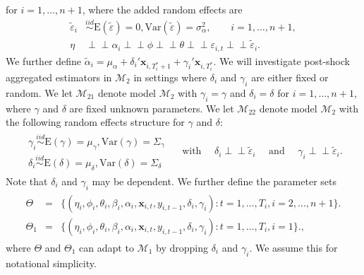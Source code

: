\documentclass[11pt]{article}
\def\mbf#1{\mathbf{#1}} %
\newcommand{\simiid}{\stackrel{iid}{\sim}} %
\newcommand{\indep}{\perp \!\!\! \perp } %
\def\mrm#1{\mathrm{#1}} %
\def\t#1{\tilde{#1}} %
\def\mc#1{\mathcal{#1}} %
\def\E#1{\mathrm{E}(#1)} %
\def\var#1{\mathrm{Var}(#1)} %
\theoremstyle{definition}
\begin{document}
for $i = 1, \ldots, n+1$, where the added random effects are
\begin{align*}
\t{\varepsilon}_{i} &\simiid  \E{\t{\varepsilon}}=0, \var{\t{\varepsilon}}=\sigma^2_{\alpha}, \qquad i = 1, \ldots, n+1,\\
\eta &\indep  \alpha_i \indep \phi \indep \theta \indep \varepsilon_{i,t} \indep \t{\varepsilon}_{i}.
\end{align*}
We further define 
$\tilde{\alpha}_i=\mu_{\alpha}+\delta_i'\mbf{x}_{i, T_i^*+1}+\gamma_i'\mbf{x}_{i, T_i^*}$. 
We will investigate post-shock aggregated estimators in $\mc{M}_2$ 
in settings where $\delta_i$ and $\gamma_i$ are either fixed or random. 
We let $\mc{M}_{21}$ denote model $\mc{M}_{2}$ with $\gamma_i = \gamma$ 
and $\delta_i = \delta$ for $i= 1, \ldots, n+1$, 
where $\gamma$ and $\delta$ are fixed unknown parameters.
We let $\mc{M}_{22}$ denote model $\mc{M}_{2}$ with the following random effects 
structure for $\gamma$ and $\delta$:
\begin{align*}
\begin{array}{c}
  \gamma_i \overset{iid}{\sim} \mrm{E}(\gamma) = \mu_\gamma, \var{\gamma} = \Sigma_\gamma \\
  \delta_i \overset{iid}{\sim} \mrm{E}(\delta) = \mu_\delta, \var{\delta} = \Sigma_\delta
\end{array}
   \quad \text{ with } \quad  \delta_i  \indep \t{\varepsilon}_{i} \quad  \text{ and } \quad \gamma_i  \indep \t{\varepsilon}_{i}.
\end{align*}
Note that $\delta_i$ and $\gamma_i$ may be dependent. We further define the parameter sets
\begin{align}
  \begin{array}{lll}
     \Theta &= &\{(\eta_i, \phi_i, \theta_i, \beta_i, \alpha_i, \mbf{x}_{i,t}, y_{i,t-1}, \delta_i, \gamma_i)\colon t= 1, \ldots, T_i, i = 2, \ldots, n +1\}.\\
    \Theta_1 &= &\{(\eta_i, \phi_i, \theta_i, \beta_i, \alpha_i, \mbf{x}_{i,t}, y_{i,t-1}, \delta_i, \gamma_i)\colon t= 1, \ldots, T_i, i = 1\}.\label{parameter},
  \end{array}
\end{align}
where $\Theta$ and $\Theta_1$ can adapt to $\mc{M}_1$ by dropping $\delta_i$ and 
$\gamma_i$. We assume this for notational simplicity.
\end{document}
